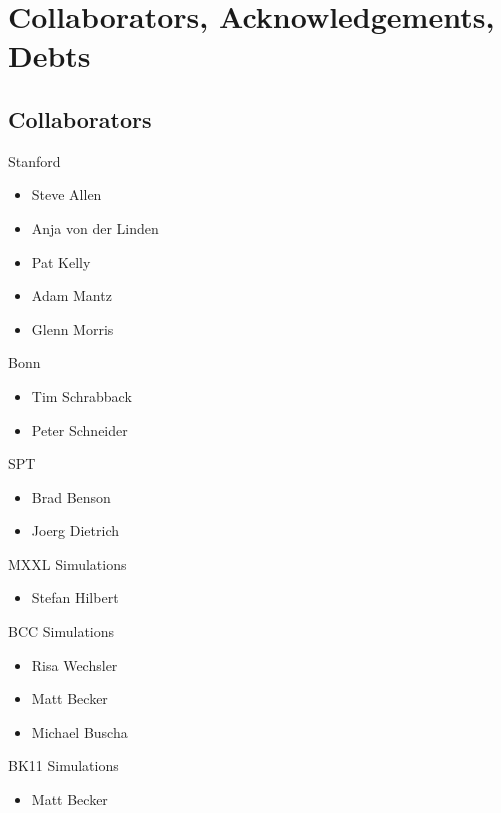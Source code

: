 \documentclass[11pt]{article}
\begin{document}
\section{Collaborators, Acknowledgements, Debts}

\subsection{Collaborators}

Stanford
\begin{itemize}
\item Steve Allen
\item Anja von der Linden
\item Pat Kelly
\item Adam Mantz
\item Glenn Morris
\end{itemize}

Bonn
\begin{itemize}
\item Tim Schrabback
\item Peter Schneider
\end{itemize}

SPT
\begin{itemize}
\item Brad Benson
\item Joerg Dietrich
\end{itemize}

MXXL Simulations
\begin{itemize}
\item Stefan Hilbert
\end{itemize}

BCC Simulations
\begin{itemize}
\item Risa Wechsler
\item Matt Becker
\item Michael Buscha
\end{itemize}

BK11 Simulations
\begin{itemize}
\item Matt Becker
\end{itemize}





\end{document}
